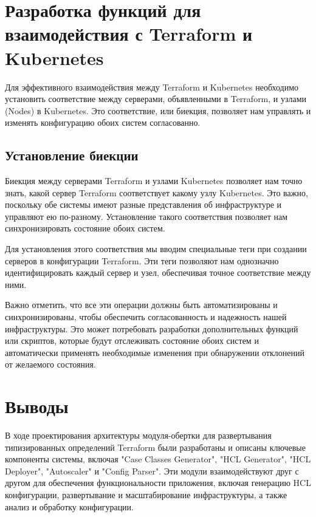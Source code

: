 \section{Разработка функций для взаимодействия с Terraform и Kubernetes}

Для эффективного взаимодействия между Terraform и Kubernetes необходимо
установить соответствие между серверами, объявленными в Terraform, и узлами
(Nodes) в Kubernetes. Это соответствие, или биекция, позволяет нам управлять и
изменять конфигурацию обоих систем согласованно.

\subsection{Установление биекции}

Биекция между серверами Terraform и узлами Kubernetes позволяет нам точно знать,
какой сервер Terraform соответствует какому узлу Kubernetes. Это важно,
поскольку обе системы имеют разные представления об инфраструктуре и управляют
ею по-разному. Установление такого соответствия позволяет нам синхронизировать
состояние обоих систем.

Для установления этого соответствия мы вводим специальные теги при создании
серверов в конфигурации Terraform. Эти теги позволяют нам однозначно
идентифицировать каждый сервер и узел, обеспечивая точное соответствие между
ними.

Важно отметить, что все эти операции должны быть автоматизированы и
синхронизированы, чтобы обеспечить согласованность и надежность нашей
инфраструктуры. Это может потребовать разработки дополнительных функций или
скриптов, которые будут отслеживать состояние обоих систем и автоматически
применять необходимые изменения при обнаружении отклонений от желаемого
состояния.

\section{Выводы}

В ходе проектирования архитектуры модуля-обертки для развертывания
типизированных определений Terraform были разработаны и описаны ключевые
компоненты системы, включая "Case Classes Generator", "HCL Generator", "HCL
Deployer", "Autoscaler" и "Config Parser". Эти модули взаимодействуют друг с
другом для обеспечения функциональности приложения, включая генерацию HCL
конфигурации, развертывание и масштабирование инфраструктуры, а также анализ и
обработку конфигурации.


